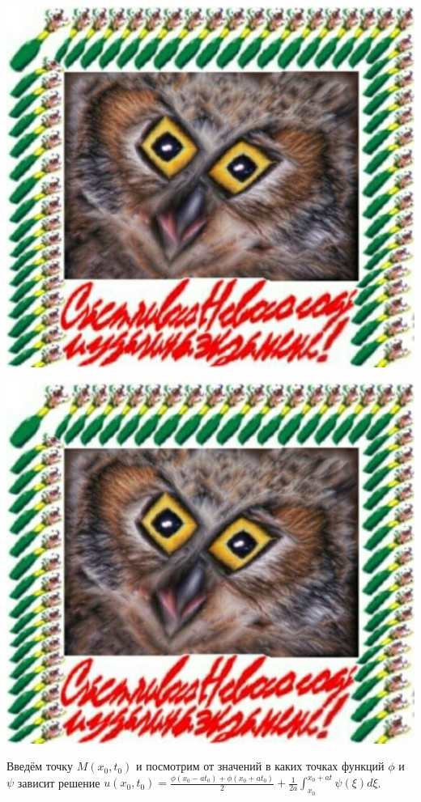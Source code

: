 \documentclass[../main.tex]{subfiles}
\begin{document}
\includegraphics[scale=0.5]{example.jpg}

\includegraphics[scale=0.5]{example.jpg}

Введём точку $M(x_0, t_0)$ и посмотрим от значений в каких точках функций
$\phi$ и $\psi$ зависит решение $u(x_0, t_0) = \frac{\phi(x_0-at_0) + \phi(x_0+at_0)}{2} + \frac{1}{2a}\int_{x_0}^{x_0+at}\psi(\xi)d\xi$.
\end{document}
